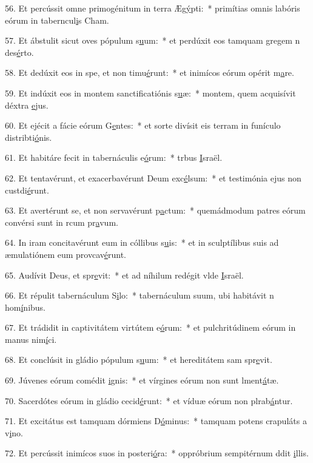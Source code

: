 56. Et percússit omne primogénitum in terra Æg\uline{ý}pti:~* primítias omnis labóris eórum in taberncul\uline{i}s Cham.\par 
57. Et ábstulit sicut oves pópulum s\uline{u}um:~* et perdúxit eos tamquam gregem n des\uline{é}rto.\par 
58. Et dedúxit eos in spe, et non timu\uline{é}runt:~* et inimícos eórum opérit m\uline{a}re.\par 
59. Et indúxit eos in montem sanctificatiónis s\uline{u}æ:~* montem, quem acquisívit déxtra \uline{e}jus.\par 
60. Et ejécit a fácie eórum G\uline{e}ntes:~* et sorte divísit eis terram in funículo distribti\uline{ó}nis.\par 
61. Et habitáre fecit in tabernáculis e\uline{ó}rum:~* trbus \uline{I}sraël.\par 
62. Et tentavérunt, et exacerbavérunt Deum exc\uline{é}lsum:~* et testimónia ejus non custdi\uline{é}runt.\par 
63. Et avertérunt se, et non servavérunt p\uline{a}ctum:~* quemádmodum patres eórum convérsi sunt in rcum pr\uline{a}vum.\par 
64. In iram concitavérunt eum in cóllibus s\uline{u}is:~* et in sculptílibus suis ad æmulatiónem eum provcav\uline{é}runt.\par 
65. Audívit Deus, et spr\uline{e}vit:~* et ad níhilum redégit vlde \uline{I}sraël.\par 
66. Et répulit tabernáculum S\uline{i}lo:~* tabernáculum suum, ubi habitávit n hom\uline{í}nibus.\par 
67. Et trádidit in captivitátem virtútem e\uline{ó}rum:~* et pulchritúdinem eórum in manus nim\uline{í}ci.\par 
68. Et conclúsit in gládio pópulum s\uline{u}um:~* et hereditátem sam spr\uline{e}vit.\par 
69. Júvenes eórum comédit \uline{i}gnis:~* et vírgines eórum non sunt lment\uline{á}tæ.\par 
70. Sacerdótes eórum in gládio cecid\uline{é}runt:~* et víduæ eórum non plrab\uline{á}ntur.\par 
71. Et excitátus est tamquam dórmiens D\uline{ó}minus:~* tamquam potens crapuláts a v\uline{i}no.\par 
72. Et percússit inimícos suos in posteri\uline{ó}ra:~* oppróbrium sempitérnum ddit \uline{i}llis.\par 

